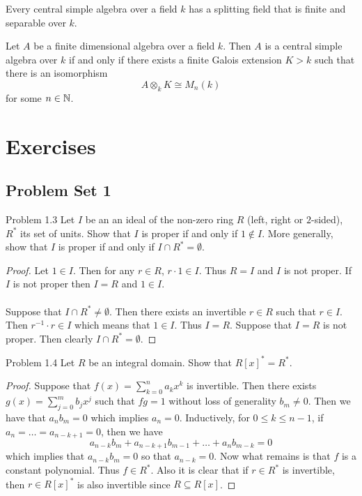 \documentclass[a4paper]{article}
\begin{document}
\begin{crl}{}{} Every central simple algebra over a field $k$ has a splitting field that is finite and separable over $k$. 
\end{crl}

\begin{crl}{}{} Let $A$ be a finite dimensional algebra over a field $k$. Then $A$ is a central simple algebra over $k$ if and only if there exists a finite Galois extension $K>k$ such that there is an isomorphism $$A\otimes_k K\cong M_n(k)$$ for some $n\in\mathbb{N}$. 
\end{crl}

\pagebreak
\section{Exercises}
\subsection{Problem Set 1}
\begin{ex}{Problem 1.3}{} Let $I$ be an an ideal of the non-zero ring $R$ (left, right or $2$-sided), $R^\ast$ its set of units. Show that $I$ is proper if and only if $1\notin I$. More generally, show that $I$ is proper if and only if $I\cap R^\ast=\emptyset$. \tcbline
\begin{proof}
Let $1\in I$. Then for any $r\in R$, $r\cdot 1\in I$. Thus $R=I$ and $I$ is not proper. If $I$ is not proper then $I=R$ and $1\in I$. \\~\\

Suppose that $I\cap R^\ast\neq\emptyset$. Then there exists an invertible $r\in R$ such that $r\in I$. Then $r^{-1}\cdot r\in I$ which means that $1\in I$. Thus $I=R$. Suppose that $I=R$ is not proper. Then clearly $I\cap R^\ast=\emptyset$. 
\end{proof}
\end{ex}

\begin{ex}{Problem 1.4}{} Let $R$ be an integral domain. Show that $R[x]^\ast=R^\ast$. \tcbline
\begin{proof}
Suppose that $f(x)=\sum_{k=0}^na_kx^k$ is invertible. Then there exists $g(x)=\sum_{j=0}^mb_jx^j$ such that $fg=1$ without loss of generality $b_m\neq 0$. Then we have that $a_nb_m=0$ which implies $a_n=0$. Inductively, for $0\leq k\leq n-1$, if $a_n=\dots=a_{n-k+1}=0$, then we have $$a_{n-k}b_m+a_{n-k+1}b_{m-1}+\dots+a_nb_{m-k}=0$$ which implies that $a_{n-k}b_m=0$ so that $a_{n-k}=0$. Now what remains is that $f$ is a constant polynomial. Thus $f\in R^\ast$. Also it is clear that if $r\in R^\ast$ is invertible, then $r\in R[x]^\ast$ is also invertible since $R\subseteq R[x]$. 
\end{proof}
\end{ex}
\end{document}
